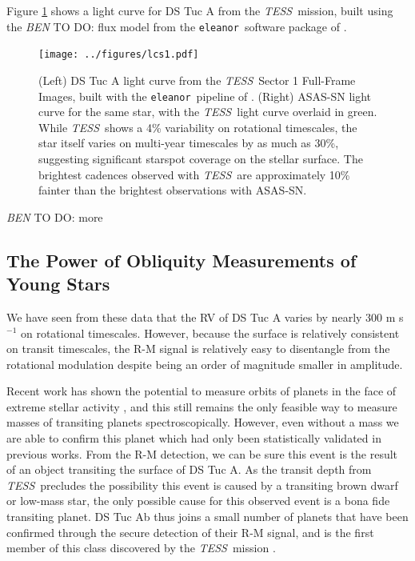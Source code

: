 \documentclass[twocolumn]{aastex63}
\newcommand{\tess}{{\it TESS}}
\newcommand{\eleanor}{\texttt{eleanor}}
\newcommand{\todo}[3]{{\color{#2} \emph{#1} TO DO: #3}}
\newcommand{\btmtodo}[1]{\todo{BEN}{blue}{#1}}
\begin{document}
Figure \ref{fig:lc_data} shows a light curve for DS Tuc A from the \tess\ mission, built using the \btmtodo{flux} model from the \eleanor\ software package of \citet{Feinstein19}.

\begin{figure}[!tbh]
  \begin{center}
    \texttt{[image: ../figures/lcs1.pdf]}
   \end{center}
  \caption{(Left) DS Tuc A light curve from the \tess\ Sector 1 Full-Frame Images, built with the \eleanor\ pipeline of \citet{Feinstein19}. (Right) ASAS-SN light curve for the same star, with the \tess\ light curve overlaid in green. While \tess\ shows a 4\% variability on rotational timescales, the star itself varies on multi-year timescales by as much as 30\%, suggesting significant starspot coverage on the stellar surface. The brightest cadences observed with \tess\ are approximately 10\% fainter than the brightest observations with ASAS-SN.}
  \label{fig:lc_data}
\end{figure}

\btmtodo{more}


\subsection{The Power of Obliquity Measurements of Young Stars}

We have seen from these data that the RV of DS Tuc A varies by nearly 300 m s$^{-1}$ on rotational timescales. 
However, because the surface is relatively consistent on transit timescales, the R-M signal is relatively easy to disentangle from the rotational modulation despite being an order of magnitude smaller in amplitude.

Recent work has shown the potential to measure orbits of planets in the face of extreme stellar activity \citep{Barragan19}, and this still remains the only feasible way to measure masses of transiting planets spectroscopically. 
However, even without a mass we are able to confirm this planet which had only been statistically validated in previous works. 
From the R-M detection, we can be sure this event is the result of an object transiting the surface of DS Tuc A. 
As the transit depth from \tess\ precludes the possibility this event is caused by a transiting brown dwarf or low-mass star, the only possible cause for this observed event is a bona fide transiting planet.
DS Tuc Ab thus joins a small number of planets that have been confirmed through the secure detection of their R-M signal, and is the first member of this class discovered by the \tess\ mission \citep{Jenkins10b, Hirano12b}. 
\end{document}
